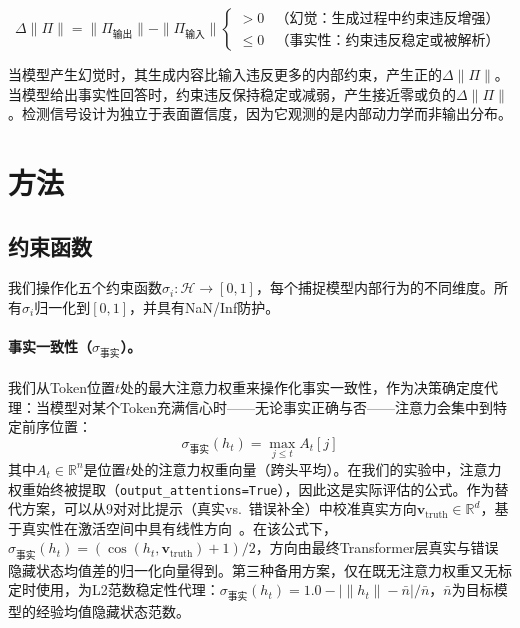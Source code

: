 \documentclass[11pt]{ctexart}
\begin{document}
\begin{equation}
\Delta\|\Pi\| = \|\Pi_{\text{输出}}\| - \|\Pi_{\text{输入}}\| \begin{cases}
> 0 & \text{（幻觉：生成过程中约束违反增强）} \\
\leq 0 & \text{（事实性：约束违反稳定或被解析）}
\end{cases}
\label{eq:hypothesis}
\end{equation}

当模型产生幻觉时，其生成内容比输入违反更多的内部约束，产生正的$\Delta\|\Pi\|$。当模型给出事实性回答时，约束违反保持稳定或减弱，产生接近零或负的$\Delta\|\Pi\|$。检测信号设计为独立于表面置信度，因为它观测的是内部动力学而非输出分布。

\section{方法}

\subsection{约束函数}

我们操作化五个约束函数$\sigma_i: \mathcal{H} \rightarrow [0,1]$，每个捕捉模型内部行为的不同维度。所有$\sigma_i$归一化到$[0,1]$，并具有NaN/Inf防护。

\paragraph{事实一致性（$\sigma_{\text{事实}}$）。}
我们从Token位置$t$处的最大注意力权重来操作化事实一致性，作为决策确定度代理：当模型对某个Token充满信心时——无论事实正确与否——注意力会集中到特定前序位置：
\begin{equation}
\sigma_{\text{事实}}(h_t) = \max_{j \leq t} A_t[j]
\end{equation}
其中$A_t \in \mathbb{R}^n$是位置$t$处的注意力权重向量（跨头平均）。在我们的实验中，注意力权重始终被提取（\texttt{output\_attentions=True}），因此这是实际评估的公式。作为替代方案，可以从9对对比提示（真实vs.\ 错误补全）中校准真实方向$\mathbf{v}_{\text{truth}} \in \mathbb{R}^d$，基于真实性在激活空间中具有线性方向~\cite{burns2022discovering}。在该公式下，$\sigma_{\text{事实}}(h_t) = (\cos(h_t, \mathbf{v}_{\text{truth}}) + 1)/2$，方向由最终Transformer层真实与错误隐藏状态均值差的归一化向量得到。第三种备用方案，仅在既无注意力权重又无标定时使用，为L2范数稳定性代理：$\sigma_{\text{事实}}(h_t) = 1.0 - |\|h_t\| - \bar{n}|/\bar{n}$，$\bar{n}$为目标模型的经验均值隐藏状态范数。
\end{document}
